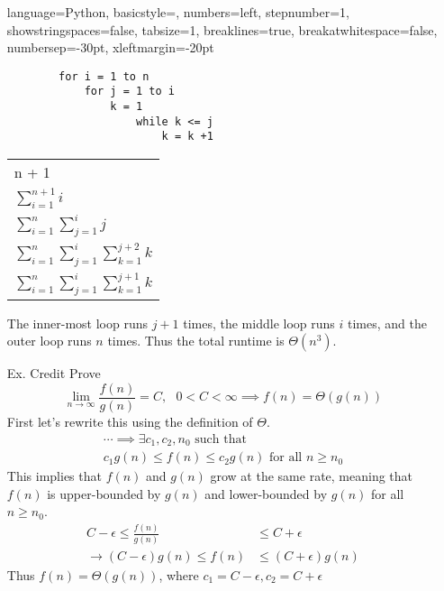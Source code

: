 \documentclass{article}
\begin{document}
\begin{enumerate}
          { %
              language=Python,
              basicstyle=\footnotesize,
              numbers=left,
              stepnumber=1,
              showstringspaces=false,
              tabsize=1,
              breaklines=true,
              breakatwhitespace=false,
              numbersep=-30pt,
              xleftmargin=-20pt
          }
          \setlength{\columnseprule}{0.1pt}
          \begin{multicols}{2}
              \begin{lstlisting}
        for i = 1 to n
            for j = 1 to i
                k = 1
                    while k <= j
                        k = k +1
        \end{lstlisting}
              \columnbreak
              \footnotesize
              \begin{tabular}{l}
                  n + 1                                                   \\
                  $\sum_{i=1}^{n+1}{i}$                                   \\
                  $\sum_{i=1}^{n}{\sum_{j=1}^{i}{j}}$                     \\
                  $\sum_{i=1}^{n}{\sum_{j=1}^{i}{\sum_{k=1}^{j + 2}{k}}}$ \\
                  $\sum_{i=1}^{n}{\sum_{j=1}^{i}{\sum_{k=1}^{j + 1}{k}}}$
              \end{tabular}
          \end{multicols}
          The inner-most loop runs \(j + 1\) times, the middle loop runs \(i\) times, and the outer loop runs \(n\) times. Thus the total runtime is \(\Theta(n^3)\).
    \item [Ex. Credit] Prove
          \begin{equation*}
              \lim_{n \to \infty} \frac{f(n)}{g(n)} = C, \text{ } 0 < C < \infty \implies f(n) = \Theta(g(n))
          \end{equation*}
          First let's rewrite this using the definition of \(\Theta\).
          \begin{align*}
              \cdots \implies \exists c_1, c_2, n_0 \text{ such that } \\
              c_1g(n) \leq f(n) \leq c_2g(n) \text{ for all } n \geq n_0
          \end{align*}
          This implies that \(f(n)\) and \(g(n)\) grow at the same rate, meaning that \(f(n)\) is upper-bounded by \(g(n)\) and lower-bounded by \(g(n)\) for all \(n \geq n_0\). \\
          \begin{align*}
              C - \epsilon \leq \frac{f(n)}{g(n)}      & \leq C + \epsilon       \\
              \rightarrow (C - \epsilon)g(n) \leq f(n) & \leq (C + \epsilon)g(n)
          \end{align*}
          Thus \(f(n) = \Theta(g(n))\), where \(c_1 = C - \epsilon, c_2 = C + \epsilon\) \\[1em]
\end{enumerate}
\end{document}
